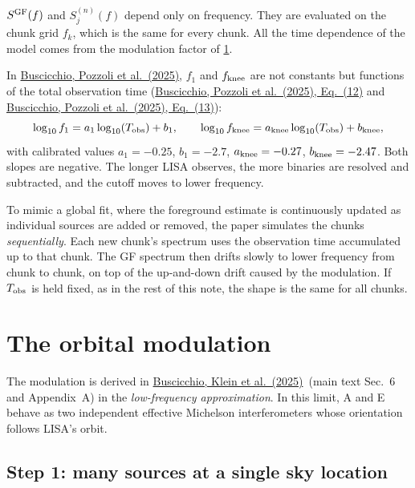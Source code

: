 \documentclass[11pt,a4paper]{article}
\newcommand{\urlPone}{https://arxiv.org/pdf/2511.03604}
\newcommand{\urlPtwo}{https://arxiv.org/pdf/2410.08263}
\newcommand{\Pone}{\href{\urlPone}{Buscicchio, Pozzoli et al.~(2025)}}
\newcommand{\Ptwo}{\href{\urlPtwo}{Buscicchio, Klein et al.~(2025)}}
\newcommand{\PoneEq}[1]{\href{\urlPone}{Buscicchio, Pozzoli et al.~(2025), Eq.~(#1)}}
\begin{document}
\begin{keybox}
$S^{\rm GF}(f)$ and $S^{(n)}_j(f)$ depend only on frequency. They are evaluated on
the chunk grid $f_k$, which is the same for every chunk. All the time dependence of
the model comes from the modulation factor of \cref{sec:modulation}.
\end{keybox}

\begin{remark}
In \Pone, $f_1$ and $f_{\rm knee}$ are not constants but functions of the total
observation time (\PoneEq{12} and \PoneEq{13}):
\begin{equation}
  \log_{10} f_1 = a_1 \log_{10}(T_{\rm obs}) + b_1, \qquad
  \log_{10} f_{\rm knee} = a_{\rm knee} \log_{10}(T_{\rm obs}) + b_{\rm knee},
\end{equation}
with calibrated values $a_1=-0.25$, $b_1=-2.7$, $a_{\rm knee}=-0.27$,
$b_{\rm knee}=-2.47$. Both slopes are negative. The longer LISA observes, the more
binaries are resolved and subtracted, and the cutoff moves to lower frequency.

To mimic a global fit, where the foreground estimate is continuously updated as
individual sources are added or removed, the paper simulates the chunks
\emph{sequentially}. Each new chunk's spectrum uses the observation time
accumulated up to that chunk. The GF spectrum then drifts slowly to lower frequency
from chunk to chunk, on top of the up-and-down drift caused by the modulation. If
$T_{\rm obs}$ is held fixed, as in the rest of this note, the shape is the same for
all chunks.
\end{remark}

\section{The orbital modulation}\label{sec:modulation}

The modulation is derived in \Ptwo\ (main text Sec.~6 and Appendix~A) in the
\emph{low-frequency approximation}. In this limit, A and E behave as two independent
effective Michelson interferometers whose orientation follows LISA's orbit.

\subsection{Step 1: many sources at a single sky location}
\end{document}
